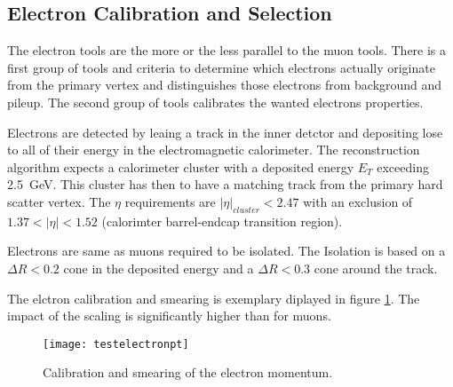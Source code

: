 \subsection{Electron Calibration and Selection}

The electron tools are the more or the less parallel to the muon tools. There is a first group of tools and criteria to determine which electrons actually originate from the primary vertex and distinguishes those electrons from background and pileup. The second group of tools calibrates the wanted electrons properties.

Electrons are detected by leaing a track in the inner detctor and depositing lose to all of their energy in the electromagnetic calorimeter. The reconstruction algorithm expects a calorimeter cluster with a deposited energy $E_T$ exceeding \SI{2.5}{\GeV}. This cluster has then to have a matching track from the primary hard scatter vertex. The $\eta$ requirements are $|\eta|_{cluster} < 2.47$ with an exclusion of $\num{1.37} < |\eta| < \num{1.52}$ (calorimter barrel-endcap transition region).

Electrons are same as muons required to be isolated. The Isolation is based on a $\Delta R < \num{0.2}$ cone in the deposited energy and a $\Delta R < \num{0.3}$ cone around the track.

The elctron calibration and smearing is exemplary diplayed in figure \ref{fig:testelectronpt}. The impact of the scaling is significantly higher than for muons.

\begin{figure}
\centering
\texttt{[image: testelectronpt]}
\caption{Calibration and smearing of the electron momentum.}
\label{fig:testelectronpt}
\end{figure}